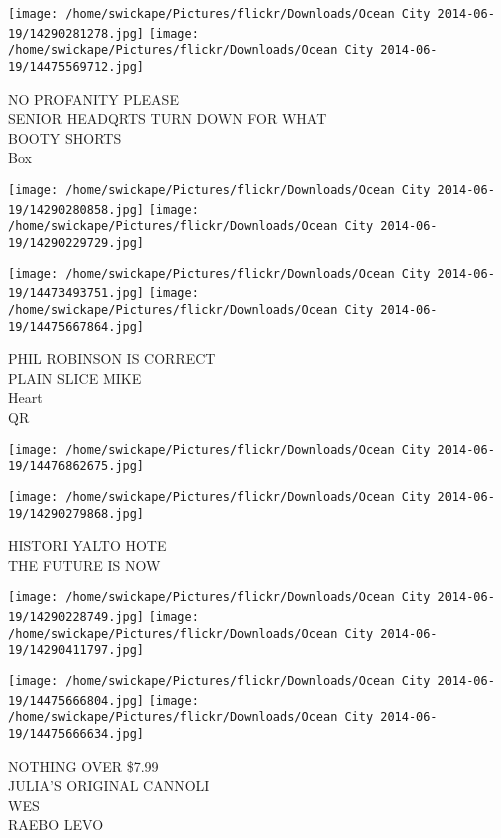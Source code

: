 \documentclass[10pt,letterpaper]{article}
\begin{document}
\texttt{[image: /home/swickape/Pictures/flickr/Downloads/Ocean City 2014-06-19/14290281278.jpg]}
\texttt{[image: /home/swickape/Pictures/flickr/Downloads/Ocean City 2014-06-19/14475569712.jpg]}

NO PROFANITY PLEASE\\
SENIOR HEADQRTS TURN DOWN FOR WHAT\\
BOOTY SHORTS\\
Box\\
\pagebreak

\texttt{[image: /home/swickape/Pictures/flickr/Downloads/Ocean City 2014-06-19/14290280858.jpg]}
\texttt{[image: /home/swickape/Pictures/flickr/Downloads/Ocean City 2014-06-19/14290229729.jpg]}

\texttt{[image: /home/swickape/Pictures/flickr/Downloads/Ocean City 2014-06-19/14473493751.jpg]}
\texttt{[image: /home/swickape/Pictures/flickr/Downloads/Ocean City 2014-06-19/14475667864.jpg]}

PHIL ROBINSON IS CORRECT\\
PLAIN SLICE MIKE\\
Heart\\
QR\\
\pagebreak

\texttt{[image: /home/swickape/Pictures/flickr/Downloads/Ocean City 2014-06-19/14476862675.jpg]}

\vspace{0.25in}
\texttt{[image: /home/swickape/Pictures/flickr/Downloads/Ocean City 2014-06-19/14290279868.jpg]}

HISTORI YALTO HOTE\\
THE FUTURE IS NOW\\
\pagebreak

\texttt{[image: /home/swickape/Pictures/flickr/Downloads/Ocean City 2014-06-19/14290228749.jpg]}
\texttt{[image: /home/swickape/Pictures/flickr/Downloads/Ocean City 2014-06-19/14290411797.jpg]}

\texttt{[image: /home/swickape/Pictures/flickr/Downloads/Ocean City 2014-06-19/14475666804.jpg]}
\texttt{[image: /home/swickape/Pictures/flickr/Downloads/Ocean City 2014-06-19/14475666634.jpg]}

NOTHING OVER \$7.99\\
JULIA'S ORIGINAL CANNOLI\\
WES\\
RAEBO LEVO\\
\pagebreak
\end{document}
